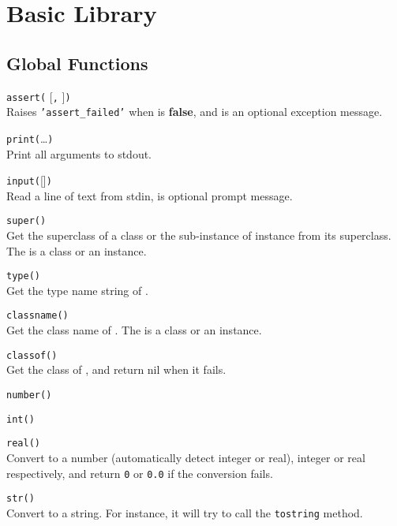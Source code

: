 \section*{Basic Library}

\subsection*{Global Functions}

\hangpar \texttt{assert(} [\texttt{,} ]\texttt{)}\\
Raises \texttt{'assert\_failed'} when  is \textbf{false}, and  is an optional exception message.

\hangpar \texttt{print(}\dots\texttt{)}\\
Print all arguments to stdout.

\hangpar \texttt{input(}[]\texttt{)}\\
Read a line of text from stdin,  is optional prompt message.

\hangpar \texttt{super(}\texttt{)}\\
Get the superclass of a class  or the sub-instance of instance  from its superclass. The  is a class or an instance.

\hangpar \texttt{type(}\texttt{)}\\
Get the type name string of .

\hangpar \texttt{classname(}\texttt{)}\\
Get the class name of . The  is a class or an instance.

\hangpar \texttt{classof(}\texttt{)}\\
Get the class of , and return nil when it fails.

\hangpar \texttt{number(}\texttt{)}

\hangpar \texttt{int(}\texttt{)}

\hangpar \texttt{real(}\texttt{)}\\
Convert  to a number (automatically detect integer or real), integer or real respectively, and return \texttt{0} or \texttt{0.0} if the conversion fails.

\hangpar \texttt{str(}\texttt{)}\\
Convert  to a string. For instance, it will try to call the \texttt{tostring} method.

